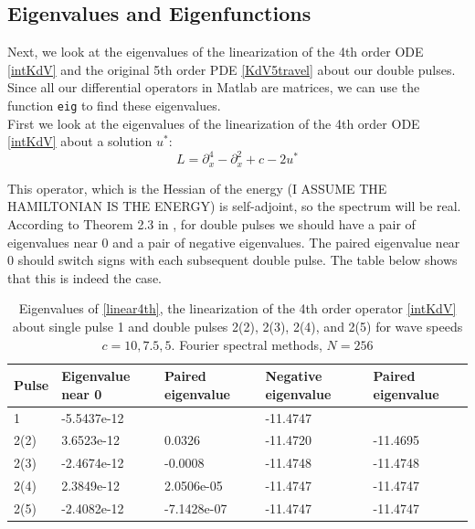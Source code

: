 \documentclass[12pt]{article}
\begin{document}
\subsection{Eigenvalues and Eigenfunctions}

Next, we look at the eigenvalues of the linearization of the 4th order ODE \eqref{intKdV} and the original 5th order PDE \eqref{KdV5travel} about our double pulses. Since all our differential operators in Matlab are matrices, we can use the function \texttt{eig} to find these eigenvalues. \\

First we look at the eigenvalues of the linearization of the 4th order ODE \eqref{intKdV} about a solution $u^*$:
\begin{equation}\label{linear4th}
L = \partial_x^4 - \partial_x^2 + c - 2 u^*
\end{equation}

 This operator, which is the Hessian of the energy (I ASSUME THE HAMILTONIAN IS THE ENERGY) is self-adjoint, so the spectrum will be real. According to Theorem 2.3 in \cite{Pelinovsky2007}, for double pulses we should have a pair of eigenvalues near 0 and a pair of negative eigenvalues. The paired eigenvalue near 0 should switch signs with each subsequent double pulse. The table below shows that this is indeed the case.

\begin{table}[H]
\begin{tabular}{l|ll|ll}
Pulse  & Eigenvalue near 0  & Paired eigenvalue & Negative eigenvalue & Paired eigenvalue \\ \hline
1      & -5.5437e-12        &                   & -11.4747            &                   \\
2(2)   & 3.6523e-12         & 0.0326            & -11.4720            & -11.4695          \\
2(3)   & -2.4674e-12        & -0.0008           & -11.4748            & -11.4748          \\
2(4)   & 2.3849e-12         & 2.0506e-05        & -11.4747            & -11.4747          \\
2(5)   & -2.4082e-12        & -7.1428e-07       & -11.4747            & -11.4747          \\
\end{tabular}
\caption{Eigenvalues of \eqref{linear4th}, the linearization of the 4th order operator \eqref{intKdV} about single pulse 1 and double pulses 2(2), 2(3), 2(4), and 2(5) for wave speeds $c = 10, 7.5, 5$. Fourier spectral methods, $N = 256$}
\end{table}
\end{document}
